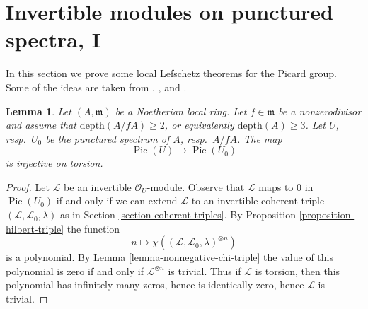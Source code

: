 \documentclass[10pt,a4paper]{amsart}
\theoremstyle{plain}
\newtheorem{lemma}[subsection]{Lemma}
\theoremstyle{definition}
\theoremstyle{remark}
\numberwithin{equation}{subsection}
\def\Pic{\mathop{\mathrm{Pic}}\nolimits}
\begin{document}
\section{Invertible modules on punctured spectra, I}
\label{section-local-lefschetz-for-pic}

\noindent
In this section we prove some local Lefschetz theorems for the Picard group.
Some of the ideas are taken from
\cite{Kollar-pic}, \cite{Bhatt-local}, and \cite{Kollar-map-pic}.

\begin{lemma}
\label{lemma-injective-torsion-in-pic}
Let $(A, \mathfrak m)$ be a Noetherian local ring. Let $f \in \mathfrak m$
be a nonzerodivisor and assume that $\text{depth}(A/fA) \geq 2$, or equivalently
$\text{depth}(A) \geq 3$. Let $U$, resp.\ $U_0$ be the punctured
spectrum of $A$, resp.\ $A/fA$. The map
$$
\Pic(U) \to \Pic(U_0)
$$
is injective on torsion.
\end{lemma}

\begin{proof}
Let $\mathcal{L}$ be an invertible $\mathcal{O}_U$-module.
Observe that $\mathcal{L}$ maps to $0$ in $\Pic(U_0)$
if and only if we can extend $\mathcal{L}$ to an invertible
coherent triple $(\mathcal{L}, \mathcal{L}_0, \lambda)$
as in Section \ref{section-coherent-triples}.
By Proposition \ref{proposition-hilbert-triple}
the function
$$
n \longmapsto \chi((\mathcal{L}, \mathcal{L}_0, \lambda)^{\otimes n})
$$
is a polynomial. By Lemma \ref{lemma-nonnegative-chi-triple}
the value of this polynomial is zero if and only if
$\mathcal{L}^{\otimes n}$ is trivial.
Thus if $\mathcal{L}$ is torsion, then this
polynomial has infinitely many zeros, hence is
identically zero, hence $\mathcal{L}$ is trivial.
\end{proof}
\end{document}
